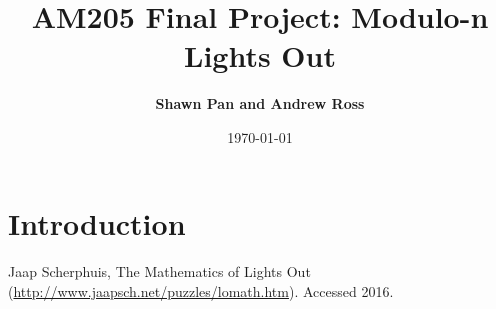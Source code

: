 \documentclass[11pt]{article}
\title{
\vspace{1cm}
\textmd{\textbf{AM205 Final Project: Modulo-n Lights Out}}\\
}
\author{\textbf{Shawn Pan and Andrew Ross}}
\date{\today}
\begin{document}
\maketitle

\section*{Introduction}

\paragraph{}

\begin{thebibliography}{9}
  Jaap Scherphuis, The Mathematics of Lights Out
  (\href{http://www.jaapsch.net/puzzles/lomath.htm}{http://www.jaapsch.net/puzzles/lomath.htm}).
  Accessed 2016.
\end{thebibliography}
\end{document}
